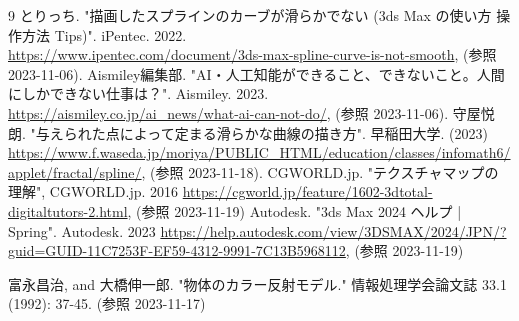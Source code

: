 \documentclass[a4j]{jarticle}
\begin{document}
\newpage
\begin{thebibliography}{9}
    とりっち. "描画したスプラインのカーブが滑らかでない (3ds Max の使い方 操作方法 Tips)". iPentec. 2022. \\
    \url{https://www.ipentec.com/document/3ds-max-spline-curve-is-not-smooth}, (参照 2023-11-06).
    Aismiley編集部. "AI・人工知能ができること、できないこと。人間にしかできない仕事は？". Aismiley. 2023. \\
    \url{https://aismiley.co.jp/ai_news/what-ai-can-not-do/}, (参照 2023-11-06).
    守屋悦朗. "与えられた点によって定まる滑らかな曲線の描き方". 早稲田大学. (2023)\\ 
\url{https://www.f.waseda.jp/moriya/PUBLIC_HTML/education/classes/infomath6/applet/fractal/spline/}, (参照 2023-11-18).
    CGWORLD.jp. "テクスチャマップの理解", CGWORLD.jp. 2016
\url{https://cgworld.jp/feature/1602-3dtotal-digitaltutors-2.html}, (参照 2023-11-19)
    Autodesk. "3ds Max 2024 ヘルプ | Spring". Autodesk. 2023
\url{https://help.autodesk.com/view/3DSMAX/2024/JPN/?guid=GUID-11C7253F-EF59-4312-9991-7C13B5968112}, (参照 2023-11-19)

    富永昌治, and 大橋伸一郎. "物体のカラー反射モデル." 情報処理学会論文誌 33.1 (1992): 37-45. (参照 2023-11-17)
\end{thebibliography}
\end{document}
